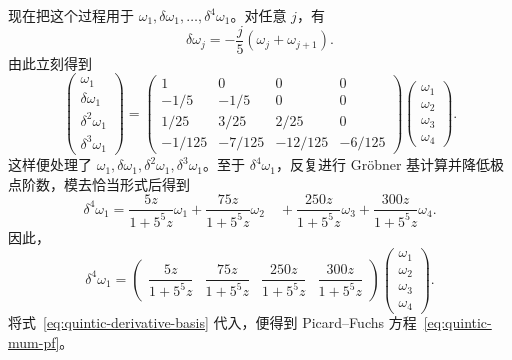 \begin{example}
现在把这个过程用于 $\omega_1,\delta\omega_1,\ldots,\delta^4\omega_1$。对任意 $j$，有
\begin{equation}\label{eq:quintic-basis-derivative}
\delta\omega_j=-\frac j5(\omega_j+\omega_{j+1}).
\end{equation}
由此立刻得到
\begin{equation}\label{eq:quintic-derivative-basis}
\begin{pmatrix}\omega_1\\\delta\omega_1\\\delta^2\omega_1\\\delta^3\omega_1\end{pmatrix}
=\begin{pmatrix}
1&0&0&0\\
-1/5&-1/5&0&0\\
1/25&3/25&2/25&0\\
-1/125&-7/125&-12/125&-6/125
\end{pmatrix}
\begin{pmatrix}\omega_1\\\omega_2\\\omega_3\\\omega_4\end{pmatrix}.
\end{equation}
这样便处理了 $\omega_1,\delta\omega_1,\delta^2\omega_1,\delta^3\omega_1$。至于 $\delta^4\omega_1$，反复进行 Gröbner 基计算并降低极点阶数，模去恰当形式后得到
\[
\delta^4\omega_1
=\frac{5z}{1+5^5z}\omega_1+\frac{75z}{1+5^5z}\omega_2
\quad+\frac{250z}{1+5^5z}\omega_3+\frac{300z}{1+5^5z}\omega_4.
\]
因此，
\[
\delta^4\omega_1
=\begin{pmatrix}
\dfrac{5z}{1+5^5z}&\dfrac{75z}{1+5^5z}&
\dfrac{250z}{1+5^5z}&\dfrac{300z}{1+5^5z}
\end{pmatrix}
\begin{pmatrix}\omega_1\\\omega_2\\\omega_3\\\omega_4\end{pmatrix}.
\]
将式~\eqref{eq:quintic-derivative-basis} 代入，便得到 Picard--Fuchs 方程~\eqref{eq:quintic-mum-pf}。
\end{example}

